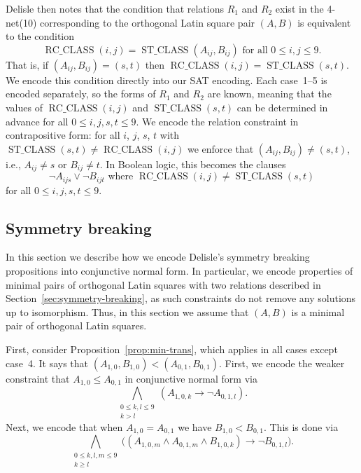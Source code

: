 \documentclass[runningheads]{llncs}
\DeclareMathOperator{\RC}{RC\_CLASS}
\DeclareMathOperator{\ST}{ST\_CLASS}
\newcommand{\limp}{\mathbin\rightarrow}
\begin{document}
Delisle then notes that the condition that relations $R_1$ and $R_2$ exist in the 4-net(10)
corresponding to the orthogonal Latin square pair $(A,B)$
is equivalent to the condition
\begin{equation} \RC(i,j)=\ST(A_{ij},B_{ij}) \text{ for all $0\leq i,j\leq9$}. \end{equation}
That is, if $(A_{ij},B_{ij})=(s,t)$ then $\RC(i,j)=\ST(s,t)$.
We encode this condition directly into our SAT encoding.
Each case~1--5 is encoded separately, so the forms of $R_1$
and $R_2$ are known, meaning that the values of $\RC(i,j)$ and $\ST(s,t)$
can be determined in advance for all $0\leq i,j,s,t\leq9$.
We encode the relation constraint in contrapositive form:
for all $i$, $j$, $s$, $t$ with $\ST(s,t)\neq\RC(i,j)$
we enforce that $(A_{ij},B_{ij})\neq(s,t)$, i.e., $A_{ij}\neq s$
or $B_{ij}\neq t$.  In Boolean logic, this becomes the clauses
\begin{equation} \lnot A_{ijs}\lor\lnot B_{ijt} \text{ where $\RC(i,j)\neq\ST(s,t)$} \end{equation}
for all $0\leq i,j,s,t\leq 9$.

\subsection{Symmetry breaking}\label{sec:symbreak-enc}

In this section we describe how we encode Delisle's symmetry breaking
propositions into conjunctive normal form.
In particular, we encode properties of minimal pairs of orthogonal
Latin squares with two relations described in Section~\ref{sec:symmetry-breaking}, as such
constraints do not remove any solutions up to isomorphism.  Thus, in this section
we assume that $(A,B)$ is a minimal pair of orthogonal Latin squares.

First, consider Proposition~\ref{prop:min-trans}, which applies
in all cases except case~4.  It says that
$(A_{1,0},B_{1,0})<(A_{0,1},B_{0,1})$.  First, we encode the weaker constraint
that $A_{1,0}\leq A_{0,1}$ in conjunctive normal form via
\begin{equation} \bigwedge_{\substack{0\leq k,l\leq9\\k>l}}(A_{1,0,k}\limp\lnot A_{0,1,l}) . \end{equation}
Next, we encode that when $A_{1,0}=A_{0,1}$ we have $B_{1,0}<B_{0,1}$.  This
is done via
\begin{equation} \bigwedge_{\substack{0\leq k,l,m\leq9\\ k\geq l}}\bigl((A_{1,0,m}\land A_{0,1,m}\land B_{1,0,k})\limp \lnot B_{0,1,l}\bigr) . \end{equation}
\end{document}
